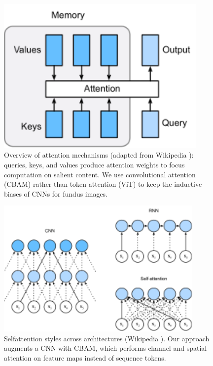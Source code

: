 \begin{figure}[t]
  \centering
  \includegraphics[width=0.92\textwidth]{../new_work/websites/Attention (machine learning) - Wikipedia_files/Attention_mechanism_overview.svg.png}
  \caption{Overview of attention mechanisms (adapted from Wikipedia \cite{wikiAttention}): queries, keys, and values produce attention weights to focus computation on salient content. We use convolutional attention (CBAM) rather than token attention (ViT) to keep the inductive biases of CNNs for fundus images.}
  \label{fig:attn_overview_wiki}
\end{figure}

\begin{figure}[t]
  \centering
  \includegraphics[width=0.9\textwidth]{../new_work/websites/Attention (machine learning) - Wikipedia_files/Self-attention_in_CNN,_RNN,_and_self-attention.svg.png}
  \caption{Self\textendash attention styles across architectures (Wikipedia \cite{wikiAttention}). Our approach augments a CNN with CBAM, which performs channel and spatial attention on feature maps instead of sequence tokens.}
  \label{fig:self_attn_styles}
\end{figure}


